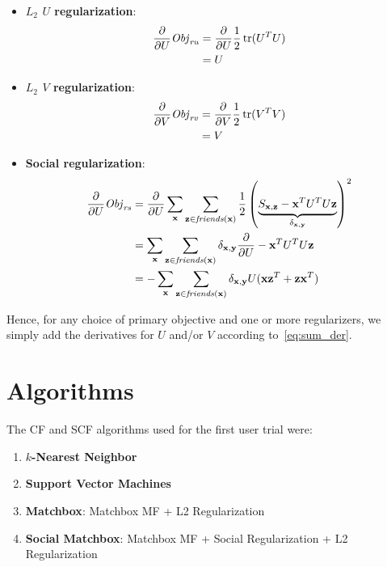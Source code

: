 \begin{itemize}
\item {\bf $L_2$ $U$ regularization}:
\begin{align*}
\frac{\partial}{\partial U} \mathit{Obj}_{\mathit{ru}} & = \frac{\partial}{\partial U} \frac{1}{2} \operatorname{tr}(U^T U) \\
& = U
\end{align*}
\item {\bf $L_2$ $V$ regularization}:
\begin{align*}
\frac{\partial}{\partial V} \mathit{Obj}_{\mathit{rv}} & = \frac{\partial}{\partial V} \frac{1}{2} \operatorname{tr}(V^T V) \\
& = V
\end{align*}
\item {\bf Social regularization}:
\begin{align*}
\frac{\partial}{\partial U} \mathit{Obj}_{\mathit{rs}} & = \frac{\partial}{\partial U} \sum_{\mathbf{x}} \sum_{\mathbf{z} \in \mathit{friends}(\mathbf{x})} \frac{1}{2} \left( \underbrace{S_{\mathbf{x},\mathbf{z}} - \mathbf{x}^T U^T U \mathbf{z}}_{\delta_{\mathbf{x},\mathbf{y}}} \right)^2 \\
& = \sum_{\mathbf{x}} \sum_{\mathbf{z} \in \mathit{friends}(\mathbf{x})} \delta_{\mathbf{x},\mathbf{y}} \frac{\partial}{\partial U} - \mathbf{x}^T U^T U \mathbf{z} \\
& = - \sum_{\mathbf{x}} \sum_{\mathbf{z} \in \mathit{friends}(\mathbf{x})} \delta_{\mathbf{x},\mathbf{y}} U (\mathbf{x} \mathbf{z}^T + \mathbf{z} \mathbf{x}^T)
\end{align*}

\end{itemize}

Hence, for any choice of primary objective and one or more regularizers,
we simply add the derivatives for $U$ and/or $V$ 
according to~\eqref{eq:sum_der}.



\section{Algorithms}

The CF and SCF algorithms used for the first user trial were:

\begin{enumerate}
\item{ {\bf $k$-Nearest Neighbor}}
\item{{\bf Support Vector Machines}}
\item{{\bf Matchbox}: Matchbox MF  + L2 Regularization}
\item{{\bf Social Matchbox}: Matchbox MF + Social Regularization + L2 Regularization}
\end{enumerate}

